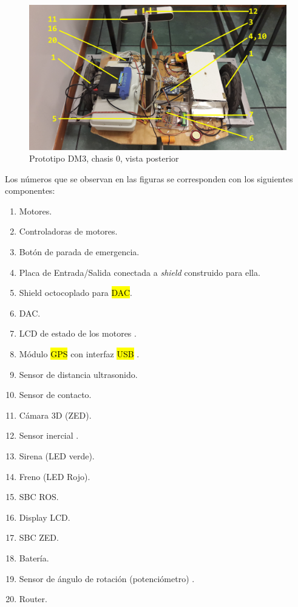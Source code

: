 \documentclass[withindex,glossary]{cam-thesis}
\begin{document}
\begin{figure}[H]
  \centering
  \begin{minipage}[b]{0.49\textwidth}
    \includegraphics[width=\textwidth]{images/Robot3}
    \caption[Prototipo DM3, chasis 0, vista posterior]{Prototipo DM3, chasis 0, vista posterior}
    \label{fig:PrototipoDM33}
  \end{minipage}
\end{figure}

Los números que se observan en las figuras se corresponden con los siguientes componentes:
\begin{enumerate}[noitemsep]
  \item Motores.
  \item Controladoras de motores.
  \item Botón de parada de emergencia.
  \item Placa de Entrada/Salida conectada a \textit{shield} construido para ella.
  \item Shield octocoplado para \hl{DAC}.
  \item DAC.
  \item LCD de estado de los motores \cite{LCD1602}.
  \item Módulo \hl{GPS} con interfaz \hl{USB} \cite{GPSModule}.
  \item Sensor de distancia ultrasonido.
  \item Sensor de contacto.
  \item Cámara 3D (ZED).
  \item Sensor inercial \cite{myAHRS}.
  \item Sirena (LED verde).
  \item Freno (LED Rojo).
  \item SBC ROS.
  \item Display LCD.
  \item SBC ZED.
  \item Batería.
  \item Sensor de ángulo de rotación (potenciómetro) \cite{Potenciometro}.
  \item Router.
\end{enumerate}
\end{document}
